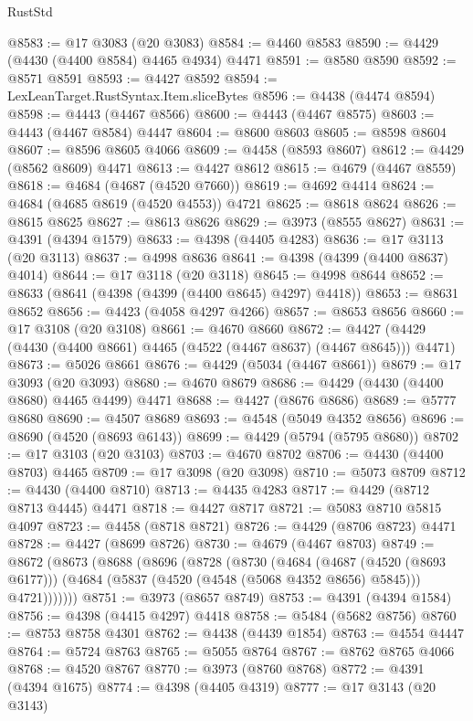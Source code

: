 \begin{lexlean}{RustStd}
\begin{coremodule}
{\begin{coremodule}
{{{{{{{{{{{{{{{{{{{{{{{{{{{{{{{{{{{{{{{{{{{{{{{{{{{{{{{{{{{{{{{{{{{{@8583 := @17 @3083 (@20 @3083)
@8584 := @4460 @8583
@8590 := @4429 (@4430 (@4400 @8584) @4465 @4934) @4471
@8591 := @8580 @8590
@8592 := @8571 @8591
@8593 := @4427 @8592
@8594 := LexLeanTarget.RustSyntax.Item.sliceBytes
@8596 := @4438 (@4474 @8594)
@8598 := @4443 (@4467 @8566)
@8600 := @4443 (@4467 @8575)
@8603 := @4443 (@4467 @8584) @4447
@8604 := @8600 @8603
@8605 := @8598 @8604
@8607 := @8596 @8605 @4066
@8609 := @4458 (@8593 @8607)
@8612 := @4429 (@8562 @8609) @4471
@8613 := @4427 @8612
@8615 := @4679 (@4467 @8559)
@8618 := @4684 (@4687 (@4520 @7660))
@8619 := @4692 @4414
@8624 := @4684 (@4685 @8619 (@4520 @4553)) @4721
@8625 := @8618 @8624
@8626 := @8615 @8625
@8627 := @8613 @8626
@8629 := @3973 (@8555 @8627)
@8631 := @4391 (@4394 @1579)
@8633 := @4398 (@4405 @4283)
@8636 := @17 @3113 (@20 @3113)
@8637 := @4998 @8636
@8641 := @4398 (@4399 (@4400 @8637) @4014)
@8644 := @17 @3118 (@20 @3118)
@8645 := @4998 @8644
@8652 := @8633 (@8641 (@4398 (@4399 (@4400 @8645) @4297) @4418))
@8653 := @8631 @8652
@8656 := @4423 (@4058 @4297 @4266)
@8657 := @8653 @8656
@8660 := @17 @3108 (@20 @3108)
@8661 := @4670 @8660
@8672 := @4427 (@4429 (@4430 (@4400 @8661) @4465 (@4522 (@4467 @8637) (@4467 @8645))) @4471)
@8673 := @5026 @8661
@8676 := @4429 (@5034 (@4467 @8661))
@8679 := @17 @3093 (@20 @3093)
@8680 := @4670 @8679
@8686 := @4429 (@4430 (@4400 @8680) @4465 @4499) @4471
@8688 := @4427 (@8676 @8686)
@8689 := @5777 @8680
@8690 := @4507 @8689
@8693 := @4548 (@5049 @4352 @8656)
@8696 := @8690 (@4520 (@8693 @6143))
@8699 := @4429 (@5794 (@5795 @8680))
@8702 := @17 @3103 (@20 @3103)
@8703 := @4670 @8702
@8706 := @4430 (@4400 @8703) @4465
@8709 := @17 @3098 (@20 @3098)
@8710 := @5073 @8709
@8712 := @4430 (@4400 @8710)
@8713 := @4435 @4283
@8717 := @4429 (@8712 @8713 @4445) @4471
@8718 := @4427 @8717
@8721 := @5083 @8710 @5815 @4097
@8723 := @4458 (@8718 @8721)
@8726 := @4429 (@8706 @8723) @4471
@8728 := @4427 (@8699 @8726)
@8730 := @4679 (@4467 @8703)
@8749 := @8672
    (@8673
      (@8688
        (@8696
          (@8728
            (@8730
              (@4684
                (@4687 (@4520 (@8693 @6177)))
                (@4684 (@5837 (@4520 (@4548 (@5068 @4352 @8656) @5845))) @4721)))))))
@8751 := @3973 (@8657 @8749)
@8753 := @4391 (@4394 @1584)
@8756 := @4398 (@4415 @4297) @4418
@8758 := @5484 (@5682 @8756)
@8760 := @8753 @8758 @4301
@8762 := @4438 (@4439 @1854)
@8763 := @4554 @4447
@8764 := @5724 @8763
@8765 := @5055 @8764
@8767 := @8762 @8765 @4066
@8768 := @4520 @8767
@8770 := @3973 (@8760 @8768)
@8772 := @4391 (@4394 @1675)
@8774 := @4398 (@4405 @4319)
@8777 := @17 @3143 (@20 @3143)
}}}}}}}}}}}}}}}}}}}}}}}}}}}}}}}}}}}}}}}}}}}}}}}}}}}}}}}}}}}}}}}}}}}}
\end{coremodule}}
\end{coremodule}
\end{lexlean}
